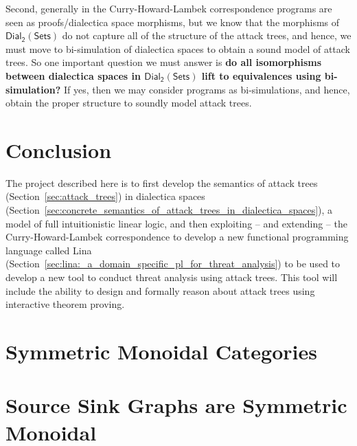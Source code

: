 \documentclass{llncs}
\newcommand{\dial}[0]{\mathsf{Dial_2}(\mathsf{Sets})}
\begin{document}
Second, generally in the Curry-Howard-Lambek correspondence programs
are seen as proofs/dialectica space morphisms, but we know that the
morphisms of $\dial$ do not capture all of the structure of the attack
trees, and hence, we must move to bi-simulation of dialectica spaces
to obtain a sound model of attack trees.  So one important question we
must answer is \textbf{do all isomorphisms between dialectica spaces
  in $\dial$ lift to equivalences using bi-simulation?}  If yes, then
we may consider programs as bi-simulations, and hence, obtain the
proper structure to soundly model attack trees.

\section{Conclusion}
\label{sec:conclusion}

The project described here is to first develop the semantics of attack
trees (Section~\ref{sec:attack_trees}) in dialectica spaces
(Section~\ref{sec:concrete_semantics_of_attack_trees_in_dialectica_spaces}),
a model of full intuitionistic linear logic, and then exploiting --
and extending -- the Curry-Howard-Lambek correspondence to develop a
new functional programming language called Lina
(Section~\ref{sec:lina:_a_domain_specific_pl_for_threat_analysis}) to
be used to develop a new tool to conduct threat analysis using attack
trees.  This tool will include the ability to design and formally
reason about attack trees using interactive theorem proving.


 

\appendix

\section{Symmetric Monoidal Categories}
\label{sec:symmetric_monoidal_categories}


\section{Source Sink Graphs are Symmetric Monoidal}
\label{sec:source_sink_graphs_are_symmetric_monoidal}

\end{document}
